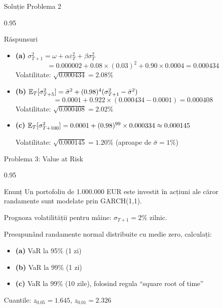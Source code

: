 \documentclass[9pt, aspectratio=169, t]{beamer}
\begin{document}
\begin{frame}{Soluție Problema 2}
    \begin{cminipage}{0.95\textwidth}
    \begin{exampleblock}{Răspunsuri}
        \begin{itemize}\setlength{\itemsep}{0pt}
            \item \textbf{(a)} $\sigma_{T+1}^2 = \omega + \alpha \varepsilon_T^2 + \beta \sigma_T^2$
            \[
                = 0.000002 + 0.08 \times (0.03)^2 + 0.90 \times 0.0004 = 0.000434
            \]
            Volatilitate: $\sqrt{0.000434} = 2.08\%$

            \vspace{0.2cm}

            \item \textbf{(b)} $\mathbb{E}_T[\sigma_{T+5}^2] = \bar{\sigma}^2 + (0.98)^4 (\sigma_{T+1}^2 - \bar{\sigma}^2)$
            \[
                = 0.0001 + 0.922 \times (0.000434 - 0.0001) = 0.000408
            \]
            Volatilitate: $\sqrt{0.000408} = 2.02\%$

            \vspace{0.2cm}

            \item \textbf{(c)} $\mathbb{E}_T[\sigma_{T+100}^2] = 0.0001 + (0.98)^{99} \times 0.000334 \approx 0.000145$

            Volatilitate: $\sqrt{0.000145} = 1.20\%$ (aproape de $\bar{\sigma} = 1\%$)
        \end{itemize}
    \end{exampleblock}
    \end{cminipage}
\end{frame}

\begin{frame}{Problema 3: Value at Risk}
    \begin{cminipage}{0.95\textwidth}
    \begin{block}{Enunț}
        Un portofoliu de 1.000.000 EUR este investit în acțiuni ale căror randamente sunt modelate prin GARCH(1,1).

        Prognoza volatilității pentru mâine: $\sigma_{T+1} = 2\%$ zilnic.

        Presupunând randamente normal distribuite cu medie zero, calculați:
        \begin{itemize}\setlength{\itemsep}{0pt}
            \item \textbf{(a)} VaR la 95\% (1 zi)
            \item \textbf{(b)} VaR la 99\% (1 zi)
            \item \textbf{(c)} VaR la 99\% (10 zile), folosind regula ``square root of time''
        \end{itemize}

        \vspace{0.3cm}
        Cuantile: $z_{0.05} = 1.645$, $z_{0.01} = 2.326$
    \end{block}
    \end{cminipage}
\end{frame}
\end{document}
